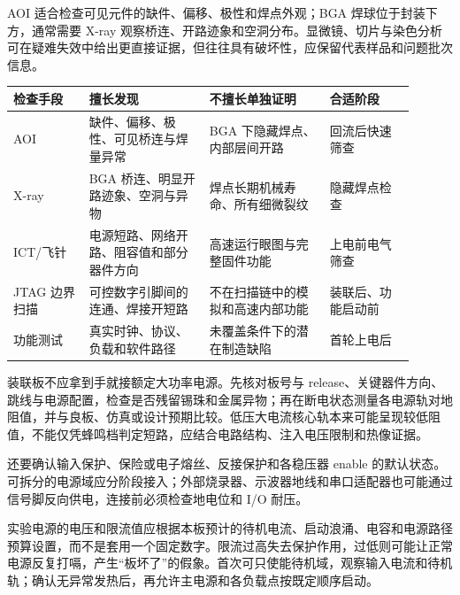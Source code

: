 AOI 适合检查可见元件的缺件、偏移、极性和焊点外观；BGA 焊球位于封装下方，通常需要 X-ray 观察桥连、开路迹象和空洞分布。显微镜、切片与染色分析可在疑难失效中给出更直接证据，但往往具有破坏性，应保留代表样品和问题批次信息。

\begin{longtable}{L{0.17\linewidth}L{0.27\linewidth}L{0.27\linewidth}L{0.19\linewidth}}
\toprule
检查手段 & 擅长发现 & 不擅长单独证明 & 合适阶段 \\
\midrule
AOI & 缺件、偏移、极性、可见桥连与焊量异常 & BGA 下隐藏焊点、内部层间开路 & 回流后快速筛查 \\\tablerowrule
X-ray & BGA 桥连、明显开路迹象、空洞与异物 & 焊点长期机械寿命、所有细微裂纹 & 隐藏焊点检查 \\\tablerowrule
ICT/飞针 & 电源短路、网络开路、阻容值和部分器件方向 & 高速运行眼图与完整固件功能 & 上电前电气筛查 \\\tablerowrule
JTAG 边界扫描 & 可控数字引脚间的连通、焊接开短路 & 不在扫描链中的模拟和高速内部功能 & 装联后、功能启动前 \\\tablerowrule
功能测试 & 真实时钟、协议、负载和软件路径 & 未覆盖条件下的潜在制造缺陷 & 首轮上电后 \\
\bottomrule
\end{longtable}


装联板不应拿到手就接额定大功率电源。先核对板号与 release、关键器件方向、跳线与电源配置，检查是否残留锡珠和金属异物；再在断电状态测量各电源轨对地阻值，并与良板、仿真或设计预期比较。低压大电流核心轨本来可能呈现较低阻值，不能仅凭蜂鸣档判定短路，应结合电路结构、注入电压限制和热像证据。

还要确认输入保护、保险或电子熔丝、反接保护和各稳压器 enable 的默认状态。可拆分的电源域应分阶段接入；外部烧录器、示波器地线和串口适配器也可能通过信号脚反向供电，连接前必须检查地电位和 I/O 耐压。


实验电源的电压和限流值应根据本板预计的待机电流、启动浪涌、电容和电源路径预算设置，而不是套用一个固定数字。限流过高失去保护作用，过低则可能让正常电源反复打嗝，产生“板坏了”的假象。首次可只使能待机域，观察输入电流和待机轨；确认无异常发热后，再允许主电源和各负载点按既定顺序启动。


